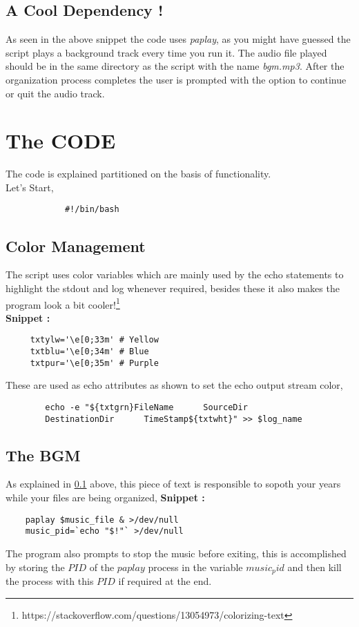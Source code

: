 \documentclass[12pt]{article}
\begin{document}
    \subsection{A Cool Dependency !}\label{music}
    \begin{flushleft}
        As seen in the above snippet the code uses \textit{paplay}, as you might have guessed the script plays a background track every time you run it. The audio file played should be in the same directory as the script with the name \textit{bgm.mp3}. After the organization process completes the user is prompted with the option to continue or quit the audio track.
    \end{flushleft}

\section{The CODE}
    
    \begin{flushleft}
        The code is explained partitioned on the basis of functionality.\\
        Let's Start, 
        \begin{verbatim}
            #!/bin/bash
        \end{verbatim}
    \end{flushleft}
    
    \subsection{Color Management}
    The script uses color variables which are mainly used by the echo statements to highlight the stdout and log whenever required, besides these it also makes the program look a bit cooler!\footnote{https://stackoverflow.com/questions/13054973/colorizing-text}
    \\\textbf{Snippet :}
    \begin{verbatim}
     txtylw='\e[0;33m' # Yellow
     txtblu='\e[0;34m' # Blue
     txtpur='\e[0;35m' # Purple
    \end{verbatim}
    These are used as echo attributes as shown to set the echo output stream color, \\
    \begin{verbatim}
        echo -e "${txtgrn}FileName      SourceDir       
        DestinationDir      TimeStamp${txtwht}" >> $log_name
    \end{verbatim}
    
    \subsection{The BGM}
    As explained in \ref{music} above, this piece of text is responsible to sopoth your years while your files are being organized,
    \clearpage
    \textbf{Snippet :}
    \begin{verbatim}
    paplay $music_file & >/dev/null
    music_pid=`echo "$!"` >/dev/null
    \end{verbatim}
    The program also prompts to stop the music before exiting, this is accomplished by storing the $PID$ of the $paplay$ process in the variable $music_pid$ and then kill the process with this $PID$ if required at the end.
\end{document}
